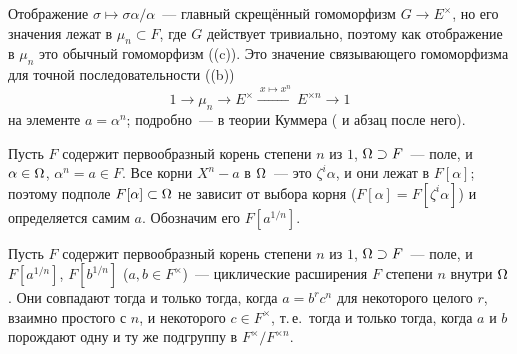 \begin{remark}
Отображение $\sigma\mapsto\sigma\alpha/\alpha$~--- главный скрещённый гомоморфизм $G\to E^\times$, но его значения лежат в
$\mu_n\subset F$, где $G$ действует тривиально, поэтому как отображение в $\mu_n$ это обычный гомоморфизм
((c)). Это значение связывающего гомоморфизма  для точной последовательности ((b))
\[
1\to\mu_n\to E^\times\xrightarrow{\ x\mapsto x^n\ }E^{\times n}\to1
\]
на элементе $a=\alpha^n$; подробно~--- в теории Куммера ( и абзац после него).
\end{remark}

Пусть $F$ содержит первообразный корень степени $n$ из $1$, $\Omega\supset F$~--- поле, и $\alpha\in\Omega$, $\alpha^n=a\in F$.
Все корни $X^n-a$ в $\Omega$~--- это $\zeta^i\alpha$, и они лежат в $F[\alpha]$; поэтому подполе $F[\alpha]\subset\Omega$ не
зависит от выбора корня ($F[\alpha]=F[\zeta^i\alpha]$) и определяется самим $a$. Обозначим его $F[a^{1/n}]$.

\begin{proposition}[5.28]
Пусть $F$ содержит первообразный корень степени $n$ из $1$, $\Omega\supset F$~--- поле, и $F[a^{1/n}]$, $F[b^{1/n}]$
($a,b\in F^\times$)~--- циклические расширения $F$ степени $n$ внутри $\Omega$. Они совпадают тогда и только тогда, когда
$a=b^rc^n$ для некоторого целого $r$, взаимно простого с $n$, и некоторого $c\in F^\times$, т.\,е.\ тогда и только тогда,
когда $a$ и $b$ порождают одну и ту же подгруппу в $F^\times/F^{\times n}$.
\end{proposition}

